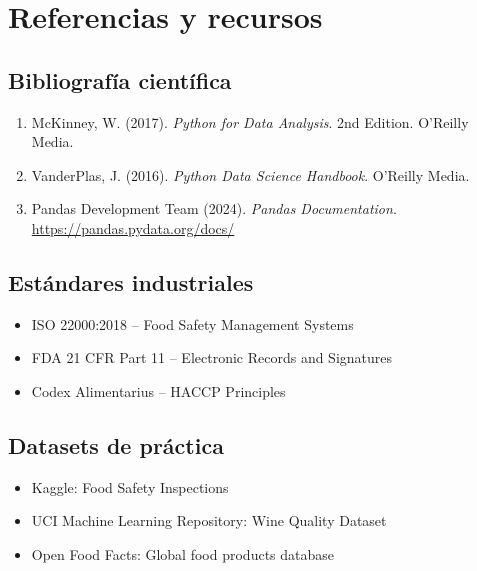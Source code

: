 \documentclass[11pt, a4paper]{article}
\begin{document}
\section*{Referencias y recursos}

\subsection*{Bibliografía científica}

\begin{enumerate}
    \item McKinney, W. (2017). \textit{Python for Data Analysis}. 2nd Edition. O'Reilly Media.
    \item VanderPlas, J. (2016). \textit{Python Data Science Handbook}. O'Reilly Media.
    \item Pandas Development Team (2024). \textit{Pandas Documentation}. \url{https://pandas.pydata.org/docs/}
\end{enumerate}

\subsection*{Estándares industriales}

\begin{itemize}
    \item ISO 22000:2018 -- Food Safety Management Systems
    \item FDA 21 CFR Part 11 -- Electronic Records and Signatures
    \item Codex Alimentarius -- HACCP Principles
\end{itemize}

\subsection*{Datasets de práctica}

\begin{itemize}
    \item Kaggle: Food Safety Inspections
    \item UCI Machine Learning Repository: Wine Quality Dataset
    \item Open Food Facts: Global food products database
\end{itemize}
\end{document}
